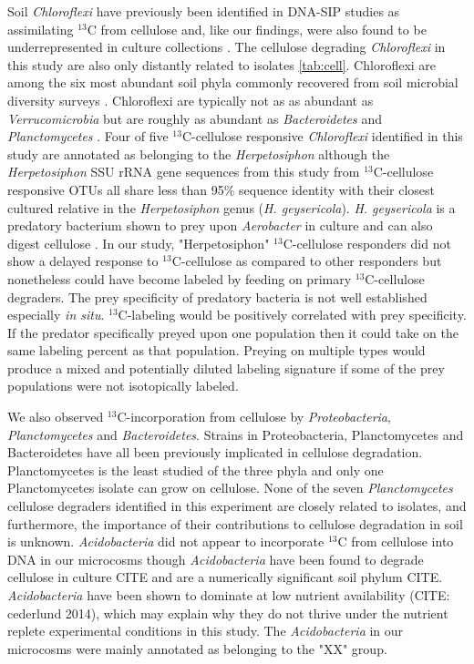 Soil \textit{Chloroflexi} have previously been identified in DNA-SIP studies as assimilating $^{13}$C from cellulose and, like our findings, were also found to be underrepresented in culture collections \citep{Schellenberger_2010}. The
cellulose degrading \textit{Chloroflexi} in this study are also
only distantly related to isolates \ref{tab:cell}.  Chloroflexi are among the
six most abundant soil phyla commonly recovered from soil microbial diversity
surveys \citep{Janssen2006}. Chloroflexi are typically not as as abundant as
\textit{Verrucomicrobia} but are roughly as abundant as \textit{Bacteroidetes}
and \textit{Planctomycetes} \citep{Janssen2006}.  Four of five
$^{13}$C-cellulose responsive \textit{Chloroflexi} identified in this study are
annotated as belonging to the \textit{Herpetosiphon} although the
\textit{Herpetosiphon} SSU rRNA gene sequences from this study from 
$^{13}$C-cellulose responsive OTUs all share less
than 95\% sequence identity with their
closest cultured relative in the \textit{Herpetosiphon} genus (\textit{H.
    geysericola}). \textit{H. geysericola} is a predatory bacterium shown to
prey upon \textit{Aerobacter} in culture and can also digest cellulose
\citep{Lewin1970}. In our study, "Herpetosiphon" $^{13}$C-cellulose responders
did not show a delayed response to $^{13}$C-cellulose as compared to other
responders but nonetheless could have
become labeled by feeding on primary $^{13}$C-cellulose degraders. The prey
specificity of predatory bacteria is not well established especially \textit{in
    situ}. $^{13}$C-labeling would be positively correlated with prey
specificity. If the predator specifically preyed upon one population then it
could take on the same labeling percent as that population. Preying on multiple
types would produce a mixed and potentially diluted labeling signature if some
of the prey populations were not isotopically labeled.

We also observed $^{13}$C-incorporation from cellulose by
\textit{Proteobacteria}, \textit{Planctomycetes} and \textit{Bacteroidetes}. 
Strains in Proteobacteria, Planctomycetes and Bacteroidetes have all been
previously implicated in cellulose degradation. Planctomycetes is the
least studied of the three phyla and only one Planctomycetes isolate can
grow on cellulose. None of the seven \textit{Planctomycetes} cellulose degraders
identified in this experiment are closely related to isolates, and furthermore, the importance of their contributions to cellulose
degradation in soil is unknown. \textit{Acidobacteria} did not appear to incorporate $^{13}$C from
cellulose into DNA in our microcosms though \textit{Acidobacteria} have been
found to degrade cellulose in culture CITE and are a numerically significant
soil phylum CITE. \textit{Acidobacteria} have been shown to dominate at low
nutrient availability (CITE: cederlund 2014), which may explain why they do not
thrive under the nutrient replete experimental conditions in this study. The
\textit{Acidobacteria} in our microcosms were mainly annotated as belonging to
the "XX" group. 


